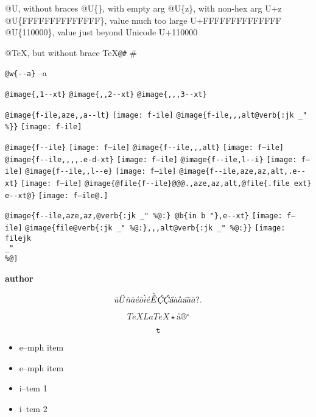 \documentclass{book}
\renewcommand{\includegraphics}[1]{\fbox{FIG #1}}
\begin{document}
@U, without braces @U\{\}, with empty arg 
@U\{z\}, with non-hex arg U+z
@U\{FFFFFFFFFFFFFF\}, value much too large U+FFFFFFFFFFFFFF
@U\{110000\}, value just beyond Unicode U+110000

@TeX, but without brace \TeX{}\texttt{@\#} \#

\texttt{@w\{{-}{-}a\}} \hbox{--a}

\texttt{@image\{,1{-}{-}xt\}} 
\texttt{@image\{,,2{-}{-}xt\}} 
\texttt{@image\{,,,3{-}{-}xt\}} 

\texttt{@image\{f-ile,aze,,a{-}{-}lt\}} \texttt{[image: f-ile]}
\texttt{@image\{f-ile,,,alt@verb\{:jk \_" \%\@\}\}} \texttt{[image: f-ile]}

\texttt{@image\{f{-}{-}ile\}} \texttt{[image: f--ile]}
\texttt{@image\{f{-}{-}ile,,,alt\}} \texttt{[image: f--ile]}
\texttt{@image\{f{-}{-}ile,,,,.e-d-xt\}} \texttt{[image: f--ile]}
\texttt{@image\{f{-}{-}ile,l{-}{-}i\}} \texttt{[image: f--ile]}
\texttt{@image\{f{-}{-}ile,,l{-}{-}e\}} \texttt{[image: f--ile]}
\texttt{@image\{f{-}{-}ile,aze,az,alt,.e{-}{-}xt\}} \texttt{[image: f--ile]}
\texttt{@image\{@file\{f{-}{-}ile\}@@@.,aze,az,alt,@file\{.file ext\} e{-}{-}xt@\}} \texttt{[image: f--ile@.]}

\texttt{@image\{f{-}{-}ile,aze,az,@verb\{:jk \_" \%@:\} @b\{in b "\},e{-}{-}xt\}} \texttt{[image: f--ile]}
\texttt{@image\{file@verb\{:jk \_" \%@:\},,,alt@verb\{:jk \_" \%@:\}\}} \texttt{[image: filejk \\\_" \\\%@]}


{\bfseries author}%

$$
\ddot{u} \ddot{U} \tilde{n} \hat{a} \acute{e} \bar{o} \grave{i} \acute{e} \grave{\bar{E}}
\textsl{\c{\'{C}}} \textsl{\c{\'{C}}} \textsl{\H{a}} \dot{a} \mathring{a} \textsl{\t{a}}
\breve{a} \check{a}
 ? .
$$

$$
TeX LaTeX \star{} \mathord{\text{\aa{}}} \circledR{} ^{\circ{}} 
$$

$$
\mathtt{t} 
$$

\begin{itemize}[label=\emph{}]
\item e--mph item
\end{itemize}

\begin{itemize}[label=\emph{} after emph]
\item e--mph item
\end{itemize}

\begin{itemize}[label=\textbullet{} a--n itemize line]
\item i--tem 1
\item i--tem 2
\end{itemize}
\end{document}
